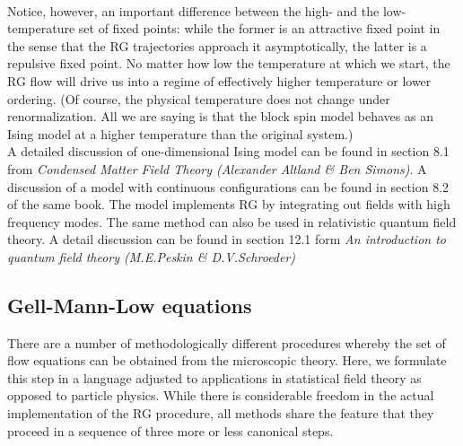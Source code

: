 \documentclass[cyan]{elegantnote}
\begin{document}
\\
Notice, however, an important difference between the high- and the low-temperature set of fixed points: while the former is an attractive fixed point in the sense that the RG trajectories approach it asymptotically, the latter is a repulsive fixed point. No matter how low the temperature at which we start, the RG flow will drive us into a regime of effectively higher temperature or lower ordering. 
(Of course, the physical temperature does not change under renormalization. All we are saying is that the block spin model behaves as an Ising model at a higher temperature than the original system.)
\\
A detailed discussion of one-dimensional Ising model can be found in section 8.1 from \emph{Condensed Matter Field Theory (Alexander Altland \& Ben Simons)}. A discussion of a model with continuous configurations can be found in section 8.2 of the same book. The model implements RG by integrating out fields with high frequency modes. The same method can also be used in relativistic quantum  field theory. A detail discussion can be found in section 12.1 form \emph{An introduction to quantum field theory (M.E.Peskin \& D.V.Schroeder)}

\subsection{Gell-Mann-Low equations}
There are a number of methodologically different procedures whereby the set of flow equations can be obtained from the microscopic theory. Here, we formulate this step in a language adjusted to applications in statistical field theory as opposed to particle physics. While there is considerable freedom in the actual implementation of the RG procedure, all methods share the feature that they proceed in a sequence of three more or less canonical steps.
\end{document}
